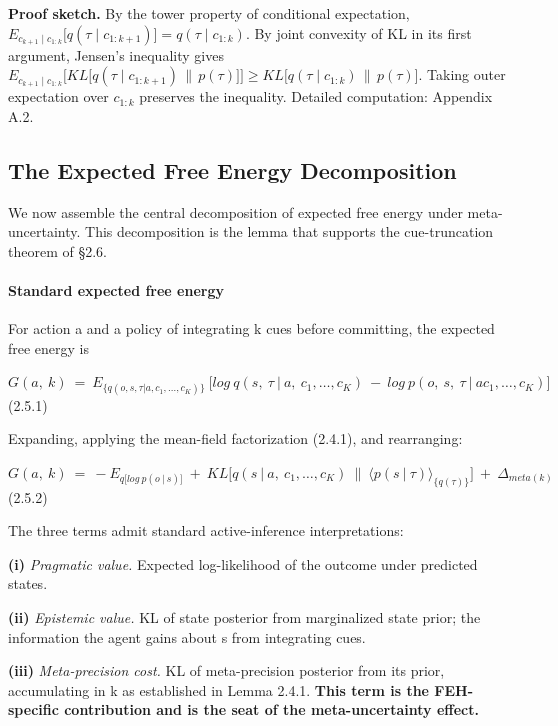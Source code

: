 \documentclass{article}
\begin{document}
\textbf{Proof sketch.} By the tower property of conditional expectation,
\(E_{c_{k + 1} \mid c_{1:k}}\lbrack q(\tau \mid c_{1:k + 1})\rbrack = q(\tau \mid c_{1:k})\).
By joint convexity of KL in its first argument, Jensen's inequality
gives
\(E_{c_{k + 1} \mid c_{1:k}}\lbrack KL\lbrack q(\tau \mid c_{1:k + 1})\, \parallel \, p(\tau)\rbrack\rbrack \geq KL\lbrack q(\tau \mid c_{1:k})\, \parallel \, p(\tau)\rbrack\).
Taking outer expectation over \(c_{1:k}\) preserves the inequality.
Detailed computation: Appendix A.2.

\subsection{The Expected Free Energy
Decomposition}\label{the-expected-free-energy-decomposition}

We now assemble the central decomposition of expected free energy under
meta-uncertainty. This decomposition is the lemma that supports the
cue-truncation theorem of \S{}2.6.

\paragraph{Standard expected free
energy}\label{standard-expected-free-energy}

For action a and a policy of integrating k cues before committing, the
expected free energy is

\(G(a,\ k)\  = \ E_{\{ q(o,s,\tau|a,c_{1},\ldots,c_{K})\}}\ \lbrack log\ q(s,\ \tau\ |\ a,\ c_{1},\ldots,c_{K})\  - \ log\ p(o,\ s,\ \tau\ |\ ac_{1},\ldots,c_{K})\rbrack\)
(2.5.1)

Expanding, applying the mean-field factorization (2.4.1), and
rearranging:

\(G(a,\ k)\  = \  - E_{q\lbrack log\ p(o\ |\ s)\rbrack}\  + \ KL\lbrack q(s\ |\ a,\ c_{1},\ldots,c_{K})\  \parallel \ {\langle p(s\ |\ \tau)\rangle}_{\{ q(\tau)\}}\rbrack\  + \ \Delta_{meta(k)}\)
(2.5.2)

The three terms admit standard active-inference interpretations:

\textbf{(i)} \emph{Pragmatic value.} Expected log-likelihood of the
outcome under predicted states.

\textbf{(ii)} \emph{Epistemic value.} KL of state posterior from
marginalized state prior; the information the agent gains about s from
integrating cues.

\textbf{(iii)} \emph{Meta-precision cost.} KL of meta-precision
posterior from its prior, accumulating in k as established in Lemma
2.4.1. \textbf{This term is the FEH-specific contribution and is the
seat of the meta-uncertainty effect.}
\end{document}
